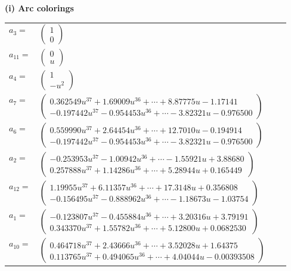 \documentclass[1p]{elsarticle_modified}
\theoremstyle{definition}
\begin{document}
\flushleft \textbf{(i) Arc colorings}\\
\begin{tabular}{m{7pt} m{180pt} m{7pt} m{180pt} }
\flushright $a_{3}=$&$\begin{pmatrix}1\\0\end{pmatrix}$ \\
\flushright $a_{11}=$&$\begin{pmatrix}0\\u\end{pmatrix}$ \\
\flushright $a_{4}=$&$\begin{pmatrix}1\\- u^2\end{pmatrix}$ \\
\flushright $a_{7}=$&$\begin{pmatrix}0.362549 u^{37}+1.69009 u^{36}+\cdots+8.87775 u-1.17141\\-0.197442 u^{37}-0.954453 u^{36}+\cdots-3.82321 u-0.976500\end{pmatrix}$ \\
\flushright $a_{6}=$&$\begin{pmatrix}0.559990 u^{37}+2.64454 u^{36}+\cdots+12.7010 u-0.194914\\-0.197442 u^{37}-0.954453 u^{36}+\cdots-3.82321 u-0.976500\end{pmatrix}$ \\
\flushright $a_{2}=$&$\begin{pmatrix}-0.253953 u^{37}-1.00942 u^{36}+\cdots-1.55921 u+3.88680\\0.257888 u^{37}+1.14286 u^{36}+\cdots+5.28944 u+0.165449\end{pmatrix}$ \\
\flushright $a_{12}=$&$\begin{pmatrix}1.19955 u^{37}+6.11357 u^{36}+\cdots+17.3148 u+0.356808\\-0.156495 u^{37}-0.888962 u^{36}+\cdots-1.18673 u-1.03754\end{pmatrix}$ \\
\flushright $a_{1}=$&$\begin{pmatrix}-0.123807 u^{37}-0.455884 u^{36}+\cdots+3.20316 u+3.79191\\0.343370 u^{37}+1.55782 u^{36}+\cdots+5.12800 u+0.0682530\end{pmatrix}$ \\
\flushright $a_{10}=$&$\begin{pmatrix}0.464718 u^{37}+2.43666 u^{36}+\cdots+3.52028 u+1.64375\\0.113765 u^{37}+0.494065 u^{36}+\cdots+4.04044 u-0.00393508\end{pmatrix}$ \\

\end{tabular}
\end{document}
